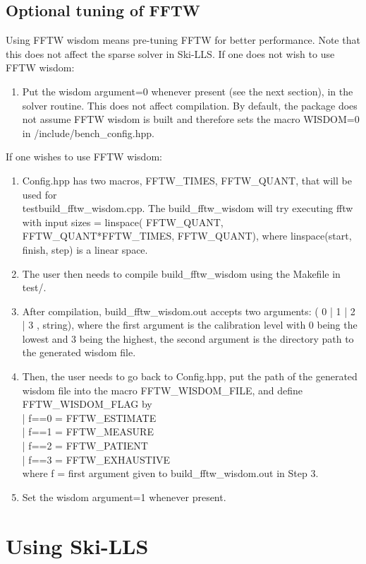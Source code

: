 \documentclass[english,11pt]{article}
\begin{document}
\subsection{Optional tuning of FFTW}
Using FFTW wisdom means pre-tuning FFTW for better performance. Note that this does not affect the sparse solver in Ski-LLS.
If one does not wish to use FFTW wisdom:
		\begin{enumerate}
			\item Put the wisdom argument=0 whenever present (see the next section), in the solver routine. This does not affect compilation. By default, the package does not assume FFTW wisdom is built and therefore sets the macro WISDOM=0 in /include/bench_config.hpp.
		\end{enumerate}
If one wishes to use FFTW wisdom:
\begin{enumerate}
		\item Config.hpp has two macros, FFTW\_TIMES, FFTW\_QUANT, that will be used for \\ test\/build\_fftw\_wisdom.cpp. The build\_fftw\_wisdom will try executing fftw with input sizes = linspace( FFTW\_QUANT, FFTW\_QUANT*FFTW\_TIMES, FFTW\_QUANT), where linspace(start, finish, step) is a linear space.
	\item The user then needs to compile build_fftw_wisdom using the Makefile in test/. 
	\item After compilation, build_fftw_wisdom.out accepts two arguments: ( 0 | 1 | 2 | 3 , string), where the first argument is the calibration level with 0 being the lowest and 3 being the highest, the second argument is the directory path to the generated wisdom file. 
	\item Then, the user needs to go back to Config.hpp, put the path of the generated wisdom file into the macro FFTW_WISDOM_FILE, and define FFTW_WISDOM_FLAG by \\
	 | f==0	= FFTW_ESTIMATE \\
	 | f==1	= FFTW_MEASURE \\
	 | f==2	= FFTW_PATIENT \\
	 | f==3 	= FFTW_EXHAUSTIVE \\
		where f = first argument given to build_fftw_wisdom.out in Step 3. 
	
	\item Set the wisdom argument=1 whenever present.
	\end{enumerate}

\section{Using Ski-LLS}
\end{document}
